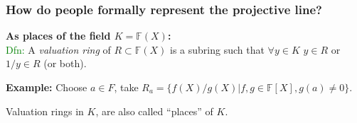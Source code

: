 \documentclass[shadesubsections,compress,14pt,mathserif]{beamer}
\newcommand{\F}{\ensuremath{{\mathbb F}}}
\newcommand{\set}[1]{\ensuremath{\left\{#1\right\}}}
\newcommand{\defeq}{\ensuremath{:=}}
\newcommand{\nl}{\\ \pause \vspace{0.2in}}
\begin{document}
\begin{frame}
 \frametitle{How do people formally represent the projective line?}
\textbf{As places of the field $K=\F(X)$:}\nl
{\textcolor{green} {Dfn:}} A \emph{valuation ring} of $R\subset \F(X)$ is a subring such that
$\forall y\in K$ $y\in R$ or $1/y\in R$ (or both).\nl

\textbf{Example:}  Choose $a\in F$, take $R_a=\{f(X)/g(X)| f,g\in \F[X], g(a)\neq 0 \}$.\nl






Valuation rings in $K$, are also called ``places'' of $K$. 


\end{frame}
% 
%  
\end{document}
